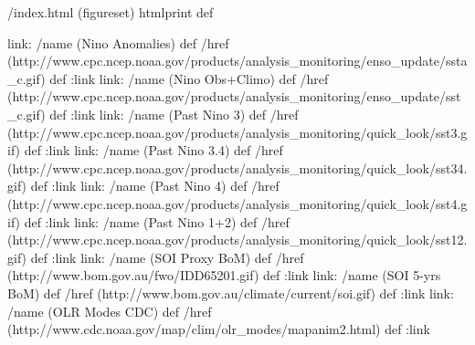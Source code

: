 /index.html {(figureset) htmlprint} def
\begin{ingrid}
link:
/name (Nino Anomalies) def
/href (http://www.cpc.ncep.noaa.gov/products/analysis_monitoring/enso_update/ssta_c.gif) def
:link
link:
/name (Nino Obs+Climo) def
/href (http://www.cpc.ncep.noaa.gov/products/analysis_monitoring/enso_update/sst_c.gif) def
:link
link:
/name (Past Nino 3) def
/href (http://www.cpc.ncep.noaa.gov/products/analysis_monitoring/quick_look/sst3.gif) def
:link
link:
/name (Past Nino 3.4) def
/href (http://www.cpc.ncep.noaa.gov/products/analysis_monitoring/quick_look/sst34.gif) def
:link
link:
/name (Past Nino 4) def
/href (http://www.cpc.ncep.noaa.gov/products/analysis_monitoring/quick_look/sst4.gif) def
:link
link:
/name (Past Nino 1+2) def
/href (http://www.cpc.ncep.noaa.gov/products/analysis_monitoring/quick_look/sst12.gif) def
:link
link:
/name (SOI Proxy BoM) def
/href (http://www.bom.gov.au/fwo/IDD65201.gif) def
:link
link:
/name (SOI 5-yrs BoM) def
/href (http://www.bom.gov.au/climate/current/soi.gif) def
:link
link:
/name (OLR Modes CDC) def
/href (http://www.cdc.noaa.gov/map/clim/olr_modes/mapanim2.html) def
:link
\end{ingrid}